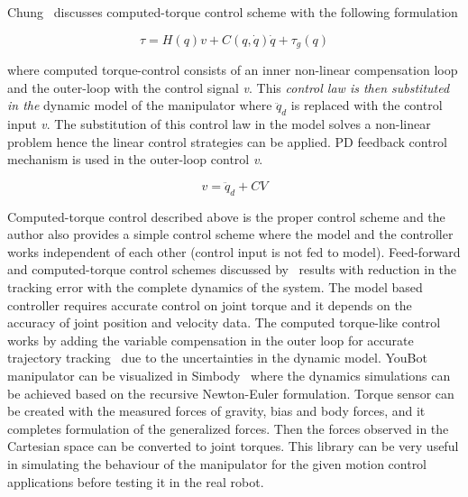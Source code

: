 Chung~\cite{Chung2016} discusses computed-torque control scheme with the following formulation

\begin{equation}
\tau = H(q) \textit{v} + C(q,\dot{q})\dot{q} + \tau_g(q)
\end{equation} 

where computed torque-control consists of an inner non-linear compensation loop and the outer-loop with the control signal \textit{v}. This \textsl{control law is then substituted in the }dynamic model of the manipulator where $\ddot{q}_d$ is replaced with the control input \textit{v}. The substitution of this control law in the model solves a non-linear problem hence the linear control strategies can be applied. PD feedback control mechanism is used in the outer-loop control \textit{v}.  

\begin{equation}
\textit{v} = \ddot{q}_d + CV
\end{equation}

Computed-torque control described above is the proper control scheme and the author also provides a simple control scheme where the model and the controller works independent of each other (control input is not fed to model). Feed-forward and computed-torque control schemes discussed by~\cite{34773} results with reduction in the tracking error with the complete dynamics of the system. The model based controller requires accurate control on joint torque and it depends on the accuracy of joint position and velocity data. The computed torque-like control works by adding the variable compensation in the outer loop for accurate trajectory tracking~\cite{Chung2016} due to the uncertainties in the dynamic model. YouBot manipulator can be visualized in Simbody~\cite{sherman2011simbody} where the dynamics simulations can be achieved based on the recursive Newton-Euler formulation. Torque sensor can be created with the measured forces of gravity, bias and body forces, and it completes formulation of the generalized forces. Then the forces observed in the Cartesian space can be converted to joint torques. This library can be very useful in simulating the behaviour of the manipulator for the given motion control applications before testing it in the real robot.